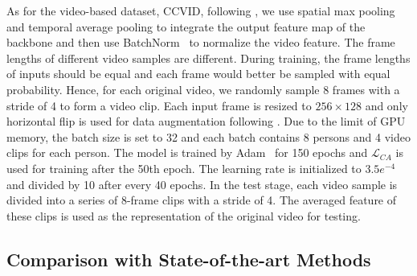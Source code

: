 \documentclass[10pt,twocolumn,letterpaper]{article}
\begin{document}
As for the video-based dataset, \ie CCVID, following \cite{Gu2020AP3D}, we use spatial max pooling and temporal average pooling to integrate the output feature map of the backbone and then use BatchNorm~\cite{Ioffe2015BN} to normalize the video feature.
The frame lengths of different video samples are different.
During training, the frame lengths of inputs should be equal and each frame would better be sampled with equal probability. 
Hence, for each original video, we randomly sample 8 frames with a stride of 4 to form a video clip.
Each input frame is resized to $256\times128$ and only horizontal flip is used for data augmentation following \cite{Gu2020AP3D}.
Due to the limit of GPU memory, the batch size is set to 32 and each batch contains 8 persons and 4 video clips for each person.
The model is trained by Adam~\cite{Kingma2014Adam} for 150 epochs and $\mathcal{L}_{CA}$ is used for training after the 50th epoch.
The learning rate is initialized to $3.5e^{-4}$ and divided by 10 after every 40 epochs. 
In the test stage, each video sample is divided into a series of 8-frame clips with a stride of 4. The averaged feature of these clips is used as the representation of the original video for testing.

\subsection{Comparison with State-of-the-art Methods}
\end{document}
